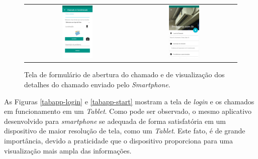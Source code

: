 \begin{figure}[H]
\centering
    \begin{tabular}{cc}
     \includegraphics[width=0.3\textwidth]{figuras/appform-chamado-uftservicos.png}  &  \includegraphics[width=0.3\textwidth]{figuras/appstart-chamadodetalhes-uftservicos.png} 
    \end{tabular}
    \caption{Tela de formulário de abertura do chamado e de visualização dos detalhes do chamado enviado pelo \textit{Smartphone}.}
    \label{form-uftservicos}
\end{figure}

As Figuras \ref{tabapp-login} e \ref{tabapp-start} mostram a tela de \textit{login} e os chamados em funcionamento em um \textit{Tablet}. Como pode ser observado, o mesmo aplicativo desenvolvido para \textit{smartphone} se adequada de forma satisfatória em um dispositivo de maior resolução de tela, como um \textit{Tablet}. Este fato, é de grande importância, devido a praticidade que o dispositivo proporciona para uma visualização mais ampla das informações.

